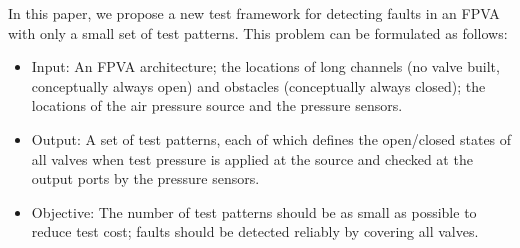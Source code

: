 \documentclass[journal,twoside]{IEEEtran}
\begin{document}
In this paper, we propose a new test framework for detecting faults in an FPVA
with only a small set of test patterns. This problem can be formulated as follows:
\begin{itemize}

  \item{Input:} An FPVA architecture; the locations of long channels (no valve
    built, conceptually always open) and obstacles (conceptually always
    closed); the locations of the air pressure source and the pressure sensors.

\item{Output:} A set of test patterns, each of which defines the
open/closed states of all valves when test pressure is applied
at the source and checked at the output ports by the pressure sensors.

\item{Objective:} The number of test patterns should be 
  as small as possible to reduce test cost; faults should be detected reliably by
  covering all valves.

\end{itemize}
\end{document}
